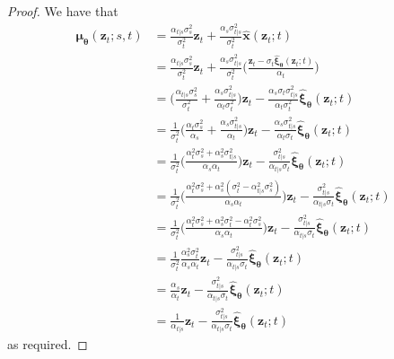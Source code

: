 \documentclass[10pt]{article}
\newcommand{\ve}[1]{\mathbf{#1}}
\newcommand{\ves}[1]{\boldsymbol{#1}}
\begin{document}
\begin{itemize}
\begin{proof}
We have that
\begin{align*}
  \ves{\mu}_{\ves{\theta}}(\ve{z}_t; s, t)
  &= \frac{\alpha_{t|s} \sigma_s^2}{\sigma_t^2} \ve{z}_t + \frac{\alpha_s \sigma_{t|s}^2}{\sigma_t^2} \hat{\ve{x}}(\ve{z}_t; t) \\
  &= \frac{\alpha_{t|s} \sigma_s^2}{\sigma_t^2} \ve{z}_t + \frac{\alpha_s \sigma_{t|s}^2}{\sigma_t^2} \bigg( \frac{\ve{z}_t - \sigma_t \hat{\ves{\xi}}_{\ves{\theta}}(\ve{z}_t; t)}{\alpha_t} \bigg) \\
  &= \bigg( \frac{\alpha_{t|s} \sigma_s^2}{\sigma_t^2} + \frac{\alpha_s \sigma_{t|s}^2}{\alpha_t \sigma_t^2} \bigg) \ve{z}_t - \frac{\alpha_s \sigma_t \sigma_{t|s}^2}{\alpha_t \sigma_t^2} \hat{\ves{\xi}}_{\ves{\theta}}(\ve{z}_t; t) \\
  &= \frac{1}{\sigma_t^2} \bigg( \frac{\alpha_t \sigma_s^2}{\alpha_s} + \frac{\alpha_s \sigma_{t|s}^2}{\alpha_t} \bigg) \ve{z}_t - \frac{\alpha_s \sigma_{t|s}^2}{\alpha_t \sigma_t} \hat{\ves{\xi}}_{\ves{\theta}}(\ve{z}_t; t) \\
  &= \frac{1}{\sigma_t^2} \bigg( \frac{\alpha_t^2 \sigma_s^2 + \alpha_s^2 \sigma_{t|s}^2}{\alpha_s \alpha_t} \bigg) \ve{z}_t - \frac{\sigma_{t|s}^2}{\alpha_{t|s} \sigma_t} \hat{\ves{\xi}}_{\ves{\theta}}(\ve{z}_t; t) \\
  &= \frac{1}{\sigma_t^2} \bigg( \frac{\alpha_t^2 \sigma_s^2 + \alpha_s^2 (\sigma_t^2 - \alpha_{t|s}^2 \sigma_s^2)}{\alpha_s \alpha_t} \bigg) \ve{z}_t - \frac{\sigma_{t|s}^2}{\alpha_{t|s} \sigma_t} \hat{\ves{\xi}}_{\ves{\theta}}(\ve{z}_t; t) \\
  &= \frac{1}{\sigma_t^2} \bigg( \frac{\alpha_t^2 \sigma_s^2 + \alpha_s^2 \sigma_t^2 - \alpha_{t}^2 \sigma_s^2}{\alpha_s \alpha_t} \bigg) \ve{z}_t - \frac{\sigma_{t|s}^2}{\alpha_{t|s} \sigma_t} \hat{\ves{\xi}}_{\ves{\theta}}(\ve{z}_t; t) \\
  &= \frac{1}{\sigma_t^2} \frac{\alpha_s^2 \sigma_t^2}{\alpha_s \alpha_t} \ve{z}_t - \frac{\sigma_{t|s}^2}{\alpha_{t|s} \sigma_t} \hat{\ves{\xi}}_{\ves{\theta}}(\ve{z}_t; t) \\
  &= \frac{\alpha_s }{\alpha_t} \ve{z}_t - \frac{\sigma_{t|s}^2}{\alpha_{t|s} \sigma_t} \hat{\ves{\xi}}_{\ves{\theta}}(\ve{z}_t; t) \\
  &= \frac{1}{\alpha_{t|s}} \ve{z}_t - \frac{\sigma_{t|s}^2}{\alpha_{t|s} \sigma_t} \hat{\ves{\xi}}_{\ves{\theta}}(\ve{z}_t; t)
\end{align*}
as required.
\end{proof}


\end{itemize}
\end{document}
